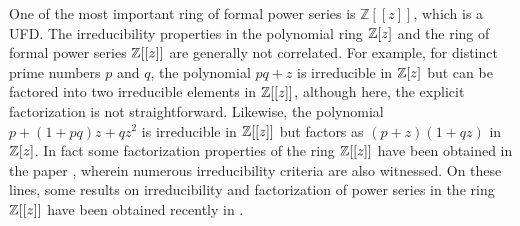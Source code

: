 \documentclass[12pt,reqno]{amsart}%
\begin{document}
One of the most important ring of formal power series is $\mathbb{Z}[[z]]$, which is a UFD. The irreducibility properties in the polynomial ring $\Bbb{Z}[z]$ and the ring of formal power series $\Bbb{Z}[[z]]$  are generally not correlated. For example, for distinct prime numbers  $p$ and $q$, the polynomial $pq+z$ is irreducible in $\Bbb{Z}[z]$ but can be factored into two irreducible elements in $\Bbb{Z}[[z]]$, although here, the explicit factorization is not straightforward. Likewise, the polynomial $p+(1+pq)z+qz^2$ is irreducible in $\Bbb{Z}[[z]]$ but factors as $(p+z)(1+qz)$ in $\Bbb{Z}[z]$. In fact some factorization properties of the ring $\Bbb{Z}[[z]]$ have been obtained in the paper \cite{Daniel2008}, wherein numerous irreducibility criteria are also witnessed. On these lines, some results on irreducibility and factorization of power series in the ring $\Bbb{Z}[[z]]$ have been obtained recently in \cite{Dutta2021,Dutta2024}.
\end{document}
